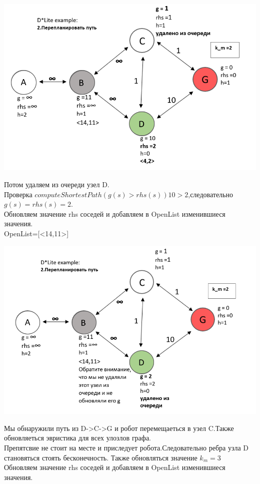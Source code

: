 \documentclass[12pt]{article}
\begin{document}
\begin{center}
         \includegraphics[width=1\textwidth]{img/example6_2.png}
    \end{center}
Потом удаляем из очереди узел D.\\Проверка 
$computeShortestPath(g(s)>rhs(s)) 10 >2 $,следовательно $g(s)=rhs(s)=2$.\\Обновляем значение rhs соседей и добавляем в OpenList изменившиеся значения.\\OpenList=[<14,11>] 
\begin{center}
         \includegraphics[width=1\textwidth]{img/example6_3.png}
    \end{center}
Мы обнаружили путь из D->C->G и робот перемещаеться в узел C.Также обновляеться эвристика для всех улозлов графа.\\
Препятсвие не стоит на месте и приследует робота.Следовательно ребра узла D становяться стоять бесконечность. Также обновляться значение $k_m=3$ Обновляем значение rhs соседей и добавляем в OpenList изменившиеся значения.
\end{document}
